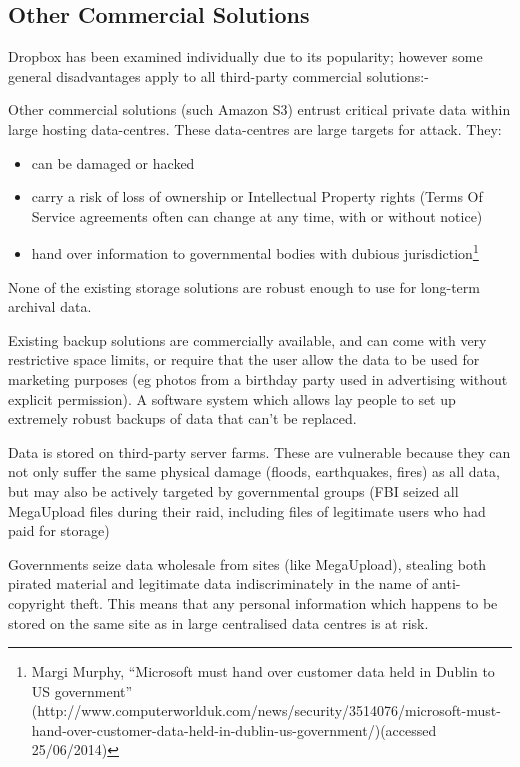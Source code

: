 \documentclass[12pt,a4paper,]{adreport}
\begin{document}
\subsection{Other Commercial
Solutions}\label{other-commercial-solutions}

Dropbox has been examined individually due to its popularity; however
some general disadvantages apply to all third-party commercial
solutions:-

Other commercial solutions (such Amazon S3) entrust critical private
data within large hosting data-centres. These data-centres are large
targets for attack. They:

\begin{itemize}
\itemsep1pt\parskip0pt
\item
  can be damaged or hacked
\item
  carry a risk of loss of ownership or Intellectual Property rights
  (Terms Of Service agreements often can change at any time, with or
  without notice)
\item
  hand over information to governmental bodies with dubious
  jurisdiction\footnote{Margi Murphy, ``Microsoft must hand over
    customer data held in Dublin to US government''
    (http://www.computerworlduk.com/news/security/3514076/microsoft-must-hand-over-customer-data-held-in-dublin-us-government/)(accessed
    25/06/2014)}
\end{itemize}

None of the existing storage solutions are robust enough to use for
long-term archival data.

Existing backup solutions are commercially available, and can come with
very restrictive space limits, or require that the user allow the data
to be used for marketing purposes (eg photos from a birthday party used
in advertising without explicit permission). A software system which
allows lay people to set up extremely robust backups of data that can't
be replaced.

Data is stored on third-party server farms. These are vulnerable because
they can not only suffer the same physical damage (floods, earthquakes,
fires) as all data, but may also be actively targeted by governmental
groups (FBI seized all MegaUpload files during their raid, including
files of legitimate users who had paid for storage)

Governments seize data wholesale from sites (like MegaUpload), stealing
both pirated material and legitimate data indiscriminately in the name
of anti-copyright theft. This means that any personal information which
happens to be stored on the same site as in large centralised data
centres is at risk.
\end{document}
